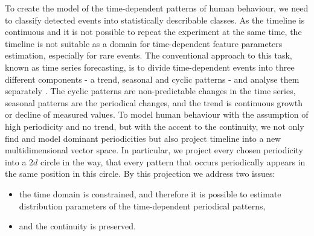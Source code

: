 To create the model of the time-dependent patterns of human behaviour, we need to classify detected events into statistically describable classes.
As the timeline is continuous and it is not possible to repeat the experiment at the same time, the timeline is not suitable as a domain for time-dependent feature parameters estimation, especially for rare events.
The conventional approach to this task, known as time series forecasting, is to divide time-dependent events into three different components - a trend, seasonal and cyclic patterns - and analyse them separately \cite{gould2008forecasting}.
The cyclic patterns are non-predictable changes in the time series, seasonal patterns are the periodical changes, and the trend is continuous growth or decline of measured values.
To model human behaviour with the assumption of high periodicity and no trend, but with the accent to the continuity, we not only find and model dominant periodicities but also project timeline into a new multidimensional vector space.
In particular, we project every chosen periodicity into a $2d$ circle in the way, that every pattern that occurs periodically appears in the same position in this circle.
By this projection we address two issues:
\begin{itemize}
    \item the time domain is constrained, and therefore it is possible to estimate distribution parameters of the time-dependent periodical patterns,
    \item and the continuity is preserved.
\end{itemize}

